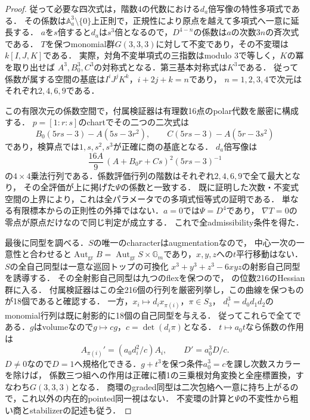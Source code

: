 \begin{proof}
従って必要な四次式は，階数4の代数における$d_a$倍写像の特性多項式である．
その係数は$\mathbb A^3_a\setminus\{0\}$上正則で，正規性により原点を越えて多項式へ一意に延長する．
$a$を$s$倍すると$d_a$は$s^3$倍となるので，$D^{4-n}$の係数は$a$の次数$3n$の斉次式である．
$T$を保つmonomial群$G(3,3,3)$に対して不変であり，その不変環は$k[I,J,K]$である．
実際，対角不変単項式の三指数はmodulo 3で等しく，$K$の冪を取り出せば
$A^3,B_0^3,C^3$の対称式となる．第三基本対称式は$K^3$である．
従って係数が属する空間の基底は$I^iJ^jK^k$，$i+2j+k=n$であり，
$n=1,2,3,4$で次元はそれぞれ$2,4,6,9$である．

この有限次元の係数空間で，付属検証器は有理数16点のpolar代数を厳密に構成する．
$p=[1:r:s]$のchartでその二つの二次式は
\[
 B_0(5rs-3)-A(5s-3r^2),\qquad
 C(5rs-3)-A(5r-3s^2)
\]
であり，検算点では$1,s,s^2,s^3$が正確に商の基底となる．
$d_a$倍写像は
\[
 \frac{16A}{9}\,(A+B_0r+Cs)^2(5rs-3)^{-1}
\]
の$4\times4$乗法行列である．係数評価行列の階数はそれぞれ$2,4,6,9$で全て最大となり，
その全評価が上に掲げた$\Psi$の係数と一致する．
既に証明した次数・不変式空間の上界により，これは全パラメータでの多項式恒等式の証明である．
単なる有限標本からの正則性の外挿ではない．$a=0$では$\Psi=D^4$であり，
$\nabla T=0$の零点が原点だけなので同じ判定が成立する．
これで全admissibility条件を得た．

最後に同型を調べる．$S$の唯一のcharacterはaugmentationなので，
中心一次の一意性と合わせると$\operatorname{Aut}_{\mathrm{gr}}B
=\operatorname{Aut}_{\mathrm{gr}}S\times\mathbb G_m$であり，$x,y,z$への$t$平行移動はない．
$S$の全自己同型は一意な巡回トップの可換化
$x^3+y^3+z^3-6xyz$の射影自己同型を誘導する．
その全射影自己同型は九つのflexを保つので，
\cite[Lemma 5.1 and proof]{ISClifford}の位数216のHessian群に入る．
付属検証器はこの全216個の行列を厳密列挙し，この曲線を保つものが18個であると確認する．
一方，$x_i\mapsto d_i x_{\pi(i)}$，$\pi\in S_3$，
$d_i^3=d_0d_1d_2$のmonomial行列は既に射影的に18個の自己同型を与える．
従ってこれらで全てである．$g$はvolumeなので$g\mapsto c g$，$c=\det(d_i\pi)$となる．
$t\mapsto a_0t$なら係数の作用は
\[
 A_{\pi(i)}'=(a_0d_i^2/c)A_i,\qquad D'=a_0^3D/c.
\]
$D\ne0$なので$D=1$へ規格化できる．$g+t^3$を保つ条件$a_0^3=c$を課し次数スカラーを除けば，
係数三つ組への作用は正確に積1の三乗根対角変換と全座標置換，すなわち$G(3,3,3)$となる．
商環のgraded同型は二次包絡へ一意に持ち上がるので，これ以外の内在的pointed同一視はない．
不変環の計算と$\Psi$の不変性から粗い商とstabilizerの記述も従う．
\end{proof}

